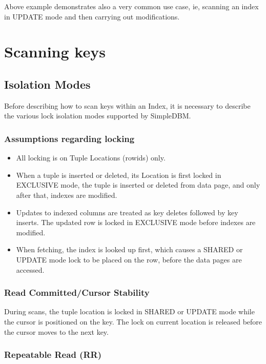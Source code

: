 \documentclass[a4paper,draft,oneside]{book}
\begin{document}
Above example demonstrates also a very common use case, ie, scanning
an index in UPDATE mode and then carrying out modifications. 

\section{Scanning keys}

\subsection{Isolation Modes}
\label{sec:isolationmodes}

Before describing how to scan keys within an Index, it is necessary to
describe the various lock isolation modes supported by SimpleDBM.

\subsubsection{Assumptions regarding locking}

\begin{itemize}
\item All locking is on Tuple Locations (rowids) only.
\item When a tuple is inserted or deleted, its Location is first
  locked in EXCLUSIVE mode, the tuple is inserted or deleted from data
  page, and only after that, indexes are modified.
\item Updates to indexed columns are treated as key deletes followed
  by key inserts. The updated row is locked in EXCLUSIVE mode before
  indexes are modified.
\item When fetching, the index is looked up first, which causes a
  SHARED or UPDATE mode lock to be placed on the row, before the data
  pages are accessed.
\end{itemize}

\subsubsection{Read Committed/Cursor Stability}

During scans, the tuple location is locked in SHARED or UPDATE mode
while the cursor is positioned on the key. The lock on current
location is released before the cursor moves to the next key.

\subsubsection{Repeatable Read (RR)}
\end{document}
